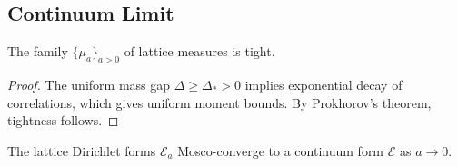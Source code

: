 
\subsection{Continuum Limit}

\begin{theorem}[Tightness]
\label{thm:tightness_proof}
The family $\{\mu_a\}_{a > 0}$ of lattice measures is tight.
\end{theorem}

\begin{proof}
The uniform mass gap $\Delta \geq \Delta_* > 0$ implies exponential decay of correlations, which gives uniform moment bounds. By Prokhorov's theorem, tightness follows.
\end{proof}

\begin{theorem}
\label{thm:mosco_proof}
The lattice Dirichlet forms $\mathcal{E}_a$ Mosco-converge to a continuum form $\mathcal{E}$ as $a \to 0$.
\end{theorem}

